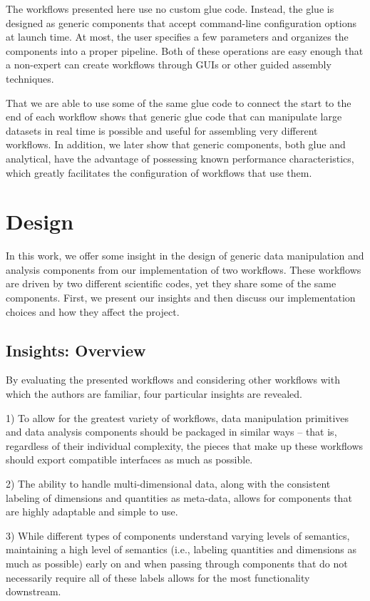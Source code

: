 \documentclass[conference]{IEEEtran}
\begin{document}
The workflows presented here use no custom glue code. Instead, the glue is
designed as generic components that accept command-line configuration options
at launch time. At most, the user specifies a few parameters and organizes
the components into a proper pipeline. Both of these operations are easy enough
that a non-expert
can create workflows through GUIs or other guided assembly techniques.

That we are able to use some of the same glue code to connect the start to the
end of each workflow shows that generic glue code that can manipulate large
datasets in real time is possible and useful for assembling very different
workflows.  In addition, we later show that generic components, both glue and
analytical, have the advantage of possessing known performance characteristics,
which greatly facilitates the configuration of workflows that use them.

\section{Design}
\label{s:design}

In this work, we offer some insight in the design of generic data manipulation
and analysis components from our implementation of two workflows. These
workflows are driven by two different scientific codes, yet they share some of
the same components. First, we present our insights and then discuss our
implementation choices and how they affect the project.

\subsection{Insights: Overview}

By evaluating the presented workflows and considering other workflows with
which the authors are familiar, four particular insights are revealed.

1) To allow for the greatest variety of workflows, data manipulation
  primitives and data analysis components should be packaged in similar ways --
  that is, regardless of their individual complexity, the pieces that make up
  these workflows should export compatible interfaces as much as possible.

2) The ability to handle multi-dimensional data, along with the consistent
  labeling of dimensions and quantities as meta-data, allows for components that
  are highly adaptable and simple to use.

3) While different types of components understand varying levels of
  semantics, maintaining a high level of semantics (i.e., labeling quantities and
  dimensions as much as possible) early on and when passing through components
  that do not necessarily require all of these labels allows for the most
  functionality downstream.
\end{document}
